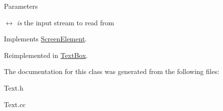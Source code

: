 \begin{DoxyParams}{Parameters}
\item[\mbox{$\leftrightarrow$} {\em is}]the input stream to read from \end{DoxyParams}


Implements \hyperlink{classScreenElement_ae5c8356d0faace202bb3ee620433677e}{ScreenElement}.

Reimplemented in \hyperlink{classTextBox_a3265df3298f92813667d1c70479f7f5c}{TextBox}.

The documentation for this class was generated from the following files:\begin{DoxyCompactItemize}
\item 
Text.h\item 
Text.cc\end{DoxyCompactItemize}
